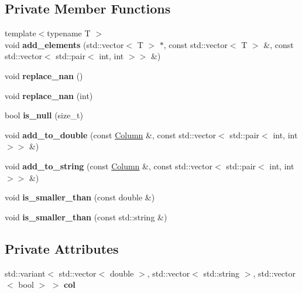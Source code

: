 \subsection*{Private Member Functions}
\begin{DoxyCompactItemize}
\item 
\mbox{\label{classColumn_a7a0741eff30c01cfbed5627e9cf263f5}} 
{\footnotesize template$<$typename T $>$ }\\void {\bfseries add\+\_\+elements} (std\+::vector$<$ T $>$ $\ast$, const std\+::vector$<$ T $>$ \&, const std\+::vector$<$ std\+::pair$<$ int, int $>$$>$ \&)
\item 
\mbox{\label{classColumn_ac56702c1c3e153d9434c89a9a471d130}} 
void {\bfseries replace\+\_\+nan} ()
\item 
\mbox{\label{classColumn_ae521b1b4d6717f928dc5d778f3dd6ef1}} 
void {\bfseries replace\+\_\+nan} (int)
\item 
\mbox{\label{classColumn_abf57b536d1d132a0f3d8841f4388bbee}} 
bool {\bfseries is\+\_\+null} (size\+\_\+t)
\item 
\mbox{\label{classColumn_a0d4c790fa30f5da90cd47ddf4df2ea7a}} 
void {\bfseries add\+\_\+to\+\_\+double} (const \hyperlink{classColumn}{Column} \&, const std\+::vector$<$ std\+::pair$<$ int, int $>$$>$ \&)
\item 
\mbox{\label{classColumn_a6edd300552de8cb4d1d31310685aad7f}} 
void {\bfseries add\+\_\+to\+\_\+string} (const \hyperlink{classColumn}{Column} \&, const std\+::vector$<$ std\+::pair$<$ int, int $>$$>$ \&)
\item 
\mbox{\label{classColumn_ad33840850da11510dea2d045214f376c}} 
void {\bfseries is\+\_\+smaller\+\_\+than} (const double \&)
\item 
\mbox{\label{classColumn_a5f693c2940b4c8158bfd5391520d7369}} 
void {\bfseries is\+\_\+smaller\+\_\+than} (const std\+::string \&)
\end{DoxyCompactItemize}
\subsection*{Private Attributes}
\begin{DoxyCompactItemize}
\item 
\mbox{\label{classColumn_afc2ec33bb14a25834cc0d4a272fe0a9d}} 
std\+::variant$<$ std\+::vector$<$ double $>$, std\+::vector$<$ std\+::string $>$, std\+::vector$<$ bool $>$ $>$ {\bfseries col}
\end{DoxyCompactItemize}
